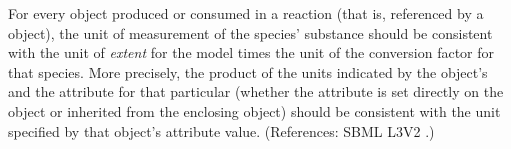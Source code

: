 For every \Species object produced or consumed in a reaction (that is, referenced
by a \SpeciesReference object), the unit of
measurement of the species' substance should be consistent with the unit of 
\emph{extent} for the model times the unit of the conversion
factor for that species.  More precisely, the product of the units indicated by the
\Model object's  and the  attribute for
that particular \Species (whether
the attribute is set directly on the \Species object or inherited from
the enclosing \Model object) should be consistent with the unit specified
by that \Species object's  attribute value.  (References:
SBML L3V2 .)

